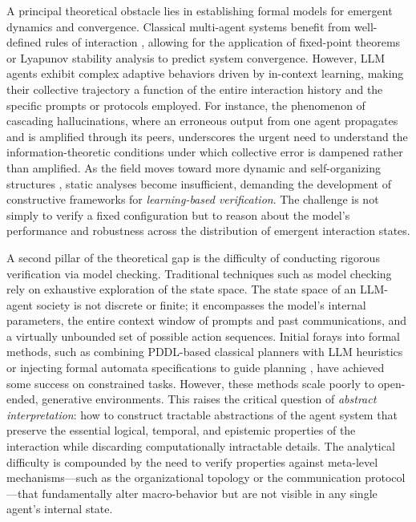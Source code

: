 \documentclass[11pt,a4paper]{article}
\begin{document}
A principal theoretical obstacle lies in establishing formal models for emergent dynamics and convergence. Classical multi-agent systems benefit from well-defined rules of interaction \cite{arxiv:1803.05464v1}, allowing for the application of fixed-point theorems or Lyapunov stability analysis to predict system convergence. However, LLM agents exhibit complex adaptive behaviors driven by in-context learning, making their collective trajectory a function of the entire interaction history and the specific prompts or protocols employed. For instance, the phenomenon of cascading hallucinations, where an erroneous output from one agent propagates and is amplified through its peers, underscores the urgent need to understand the information-theoretic conditions under which collective error is dampened rather than amplified. As the field moves toward more dynamic and self-organizing structures \cite{arxiv:2403.08282v2}, static analyses become insufficient, demanding the development of constructive frameworks for \emph{learning-based verification}. The challenge is not simply to verify a fixed configuration but to reason about the model's performance and robustness across the distribution of emergent interaction states.

A second pillar of the theoretical gap is the difficulty of conducting rigorous verification via model checking. Traditional techniques such as model checking rely on exhaustive exploration of the state space. The state space of an LLM-agent society is not discrete or finite; it encompasses the model's internal parameters, the entire context window of prompts and past communications, and a virtually unbounded set of possible action sequences. Initial forays into formal methods, such as combining PDDL-based classical planners with LLM heuristics \cite{arxiv:2403.17246v1} or injecting formal automata specifications to guide planning \cite{arxiv:2402.00798v2}, have achieved some success on constrained tasks. However, these methods scale poorly to open-ended, generative environments. This raises the critical question of \emph{abstract interpretation}: how to construct tractable abstractions of the agent system that preserve the essential logical, temporal, and epistemic properties of the interaction while discarding computationally intractable details. The analytical difficulty is compounded by the need to verify properties against meta-level mechanisms---such as the organizational topology \cite{arxiv:2402.16823v2} or the communication protocol---that fundamentally alter macro-behavior but are not visible in any single agent's internal state.
\end{document}
